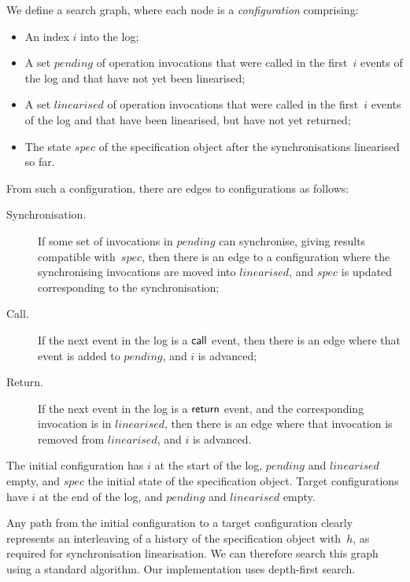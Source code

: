 We define a search graph, where each node is a \emph{configuration}
comprising:
%
\begin{itemize}
\item An index $i$ into the log;

\item A set $pending$ of operation invocations that were called in the
  first~$i$ events of the log and that have not yet been linearised;

\item A set $linearised$ of operation invocations that were called in the
  first~$i$ events of the log and that have been linearised, but have not yet
  returned;

\item The state $spec$ of the specification object after the synchronisations
  linearised so far.
\end{itemize}
%
From such a configuration, there are edges to configurations as follows:
%
\def\edgeFont#1{\rm\textsf{#1}}
\begin{description}
\item[\edgeFont{Synchronisation}.] If some set of invocations in $pending$ can
  synchronise, giving results compatible with~$spec$, then there is an edge to
  a configuration where the synchronising invocations are moved into
  $linearised$, and $spec$ is updated corresponding to the synchronisation;

\item[\edgeFont{Call}.] If the next event in the log is a $\mathsf{call}$ event, then
  there is an edge where that event is added to $pending$, and $i$ is
  advanced;

\item[\edgeFont{Return}.] If the next event in the log is a $\mathsf{return}$ event,
  and the corresponding invocation is in $linearised$, then there is an edge
  where that invocation is removed from $linearised$, and $i$ is advanced.
\end{description}
%
The initial configuration has $i$ at the start of the log, $pending$ and
$linearised$ empty, and $spec$ the initial state of the specification object.
Target configurations have $i$ at the end of the log, and $pending$ and
$linearised$ empty.

Any path from the initial configuration to a target configuration clearly
represents an interleaving of a history of the specification object with~$h$,
as required for synchronisation linearisation.  We can therefore search this
graph using a standard algorithm.  Our implementation uses depth-first search.

